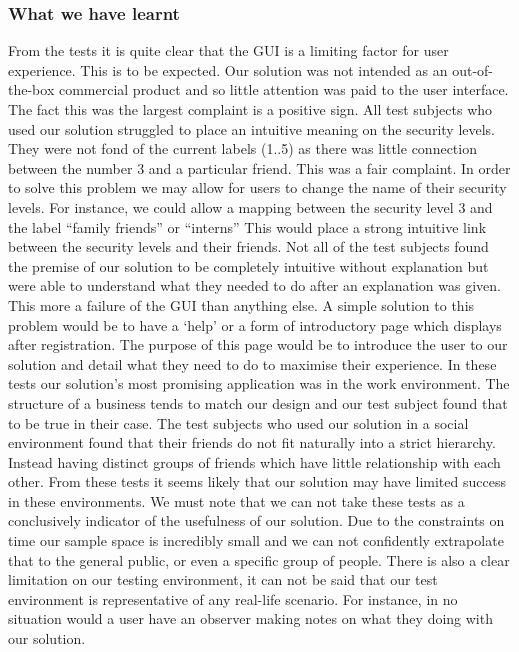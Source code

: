 \documentclass[12pt, titlepage]{article}
\begin{document}
\subsubsection{What we have learnt}
From the tests it is quite clear that the GUI is a limiting factor for user experience. This is to be expected. Our solution was not intended as an out-of-the-box commercial product and so little attention was paid to the user interface. The fact this was the largest complaint is a positive sign.
\newline \indent All test subjects who used our solution struggled to place an intuitive meaning on the security levels. They were not fond of the current labels (1..5) as there was little connection between the number 3 and a particular friend. This was a fair complaint. In order to solve this problem we may allow for users to change the name of their security levels. For instance, we could allow a mapping between the security level 3 and the label ``family friends'' or ``interns'' This would place a strong intuitive link between the security levels and their friends.
\newline \indent Not all of the test subjects found the premise of our solution to be completely intuitive without explanation but were able to understand what they needed to do after an explanation was given. This more a failure of the GUI than anything else. A simple solution to this problem would be to have a `help' or a form of introductory page which displays after registration. The purpose of this page would be to introduce the user to our solution and detail what they need to do to maximise their experience. 
\newline \indent In these tests our solution's most promising application was in the work environment. The structure of a business tends to match our design and our test subject found that to be true in their case. The test subjects who used our solution in a social environment found that their friends do not fit naturally into a strict hierarchy. Instead having distinct groups of friends which have little relationship with each other. From these tests it seems likely that our solution may have limited success in these environments.
\newline \indent We must note that we can not take these tests as a conclusively indicator of the usefulness of our solution. Due to the constraints on time our sample space is incredibly small and we can not confidently extrapolate that to the general public, or even a specific group of people. There is also a clear limitation on our testing environment, it can not be said that our test environment is representative of any real-life scenario. For instance, in no situation would a user have an observer making notes on what they doing with our solution.
\end{document}

